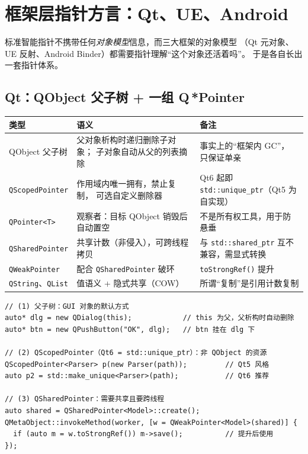 \documentclass[12pt,a4paper,fontset=fandol]{ctexbook}
\begin{document}
\section{框架层指针方言：Qt、UE、Android}

标准智能指针不携带任何\emph{对象模型}信息，而三大框架的对象模型
（Qt 元对象、UE 反射、Android Binder）都需要指针理解``这个对象还活着吗''。
于是各自长出一套指针体系。

\subsection{Qt：QObject 父子树 + 一组 Q\,*Pointer}

\begin{longtable}{@{}>{\raggedright\arraybackslash}p{}>{\raggedright\arraybackslash}p{}>{\raggedright\arraybackslash}p{}@{}}
\toprule
\textbf{类型} & \textbf{语义} & \textbf{备注} \\
\midrule
QObject 父子树 & 父对象析构时递归删除子对象；
  子对象自动从父的列表摘除 & 事实上的``框架内 GC''，
  只保证单亲 \\
\addlinespace
\texttt{QScopedPointer} & 作用域内唯一拥有，禁止复制，
  可选自定义删除器 & Qt6 起即 \texttt{std::unique\_ptr}（Qt5 为自实现） \\
\addlinespace
\texttt{QPointer<T>} & 观察者：目标 QObject 销毁后自动置空 &
  不是所有权工具，用于防悬垂 \\
\addlinespace
\texttt{QSharedPointer} & 共享计数（非侵入），可跨线程拷贝 &
  与 \texttt{std::shared\_ptr} 互不兼容，需显式转换 \\
\addlinespace
\texttt{QWeakPointer} & 配合 \texttt{QSharedPointer} 破环 &
  \texttt{toStrongRef()} 提升 \\
\addlinespace
\texttt{QString}、\texttt{QList} & 值语义 + 隐式共享（COW） &
  所谓``复制''是引用计数复制 \\
\bottomrule
\end{longtable}

\begin{lstlisting}[caption={Qt 的三条所有权路径（同一程序可并存）}]
// (1) 父子树：GUI 对象的默认方式
auto* dlg = new QDialog(this);            // this 为父，父析构时自动删除
auto* btn = new QPushButton("OK", dlg);   // btn 挂在 dlg 下

// (2) QScopedPointer（Qt6 = std::unique_ptr）：非 QObject 的资源
QScopedPointer<Parser> p(new Parser(path));         // Qt5 风格
auto p2 = std::make_unique<Parser>(path);           // Qt6 推荐

// (3) QSharedPointer：需要共享且要跨线程
auto shared = QSharedPointer<Model>::create();
QMetaObject::invokeMethod(worker, [w = QWeakPointer<Model>(shared)] {
  if (auto m = w.toStrongRef()) m->save();          // 提升后使用
});
\end{lstlisting}
\end{document}
